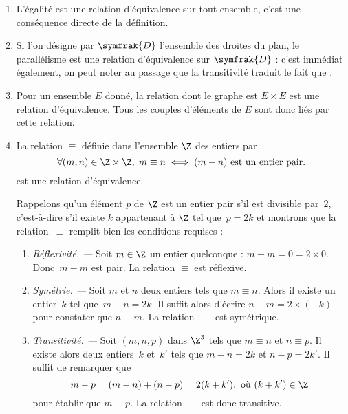 \begin{example}[Exemples]
\begin{enumerate}
\item L'égalité est une relation d'équivalence sur tout ensemble, c'est une conséquence directe de la définition.
\item Si l'on désigne par $\symfrak{D}$ l'ensemble des droites du plan, le parallélisme est une relation d'équivalence sur $\symfrak{D}$ : c'est immédiat également,  on peut noter au passage que la transitivité traduit le fait que .
\item Pour un ensemble $E$ donné, la relation dont le graphe est $E\times E$ est une relation d'équivalence. Tous les couples d'éléments de $E$ sont donc liés par cette relation.
\item La relation $\equiv$ définie dans l'ensemble $\Z$ des entiers par
\[\forall (m,n)\in\Z\times\Z,\; m\equiv n \iff (m-n) \text{ est un entier pair.}\]
est une relation d'équivalence.

Rappelons qu'un élément $p$ de $\Z$ est un entier pair s'il est divisible par~$2$, c'est-à-dire s'il existe $k$ appartenant à $\Z$ tel que~$p=2k$ et montrons que la relation~$\equiv$ remplit bien les conditions requises :
\begin{enumerate}
\item \emph{Réflexivité. — }Soit $m\in\Z$ un entier quelconque : $m-m=0=2\times0$. Donc~$m-m$ est pair. La relation $\equiv$ est réflexive.
\item \emph{Symétrie. — }Soit $m$ et $n$ deux entiers tels que $m\equiv n$. Alors il existe un entier~$k$ tel que~$m-n=2k$. Il suffit alors d'écrire $n-m=2\times(-k)$ pour constater que $n\equiv m$. La relation~$\equiv$ est symétrique.
\item\emph{Transitivité. — }Soit $(m,n,p)$ dans $\Z^3$ tels que $m\equiv n$ et $n\equiv p$. Il existe alors deux entiers~$k$ et~$k'$ tels que \mbox{$m-n=2k$} et $n-p=2k'$. Il suffit de remarquer que 
\[m-p=(m-n)+(n-p)=2(k+k'), \text{ où $(k+k')\in\Z$}\] 
pour établir que $m\equiv p$. La relation $\equiv$ est donc transitive.
\end{enumerate}
\end{enumerate}
\end{example}

